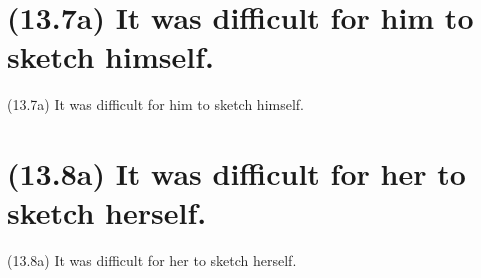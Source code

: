 \documentclass{article}
\begin{document}
%
%

\section*{(13.7a) It was difficult for him to sketch himself.}

\bigbreak
\begin{enumerate*}
\item[(13.7a)] It was difficult for him to sketch himself.
\end{enumerate*}
\bigbreak

\bigbreak
\begin{minipage}{\textwidth}
\end{minipage}
\bigbreak

\clearpage

%
%

\section*{(13.8a) It was difficult for her to sketch herself.}

\bigbreak
\begin{enumerate*}
\item[(13.8a)] It was difficult for her to sketch herself.
\end{enumerate*}
\bigbreak
\end{document}
